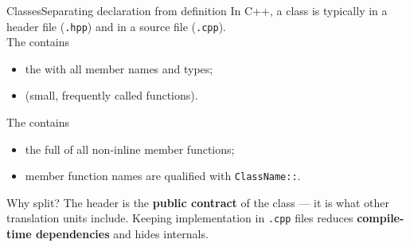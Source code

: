 \begin{frame}{Classes}{Separating declaration from definition}
	\justifying
	In C++, a class is typically  in a header file (\texttt{.hpp}) and  in a source file (\texttt{.cpp}).\\
	\bigskip
	The  contains
	\begin{itemize}
		\item the  with all member names and types;
		\item {} (small, frequently called functions).
	\end{itemize}
	\bigskip
	The  contains
	\begin{itemize}
		\item the full  of all non-inline member functions;
		\item member function names are qualified with \texttt{ClassName::}.
	\end{itemize}
	\bigskip
	\begin{block}{Why split?}
		\justifying
		The header is the \textbf{public contract} of the class — it is what other translation units include.
		Keeping implementation in \texttt{.cpp} files reduces \textbf{compile-time dependencies} and hides internals.
	\end{block}
\end{frame}
